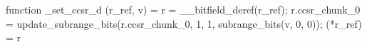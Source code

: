 function _set_ccsr_d (r_ref, v) = {
    r = __bitfield_deref(r_ref);
    r.ccsr_chunk_0 = update_subrange_bits(r.ccsr_chunk_0, 1, 1, subrange_bits(v, 0, 0));
    (*r_ref) = r
}
